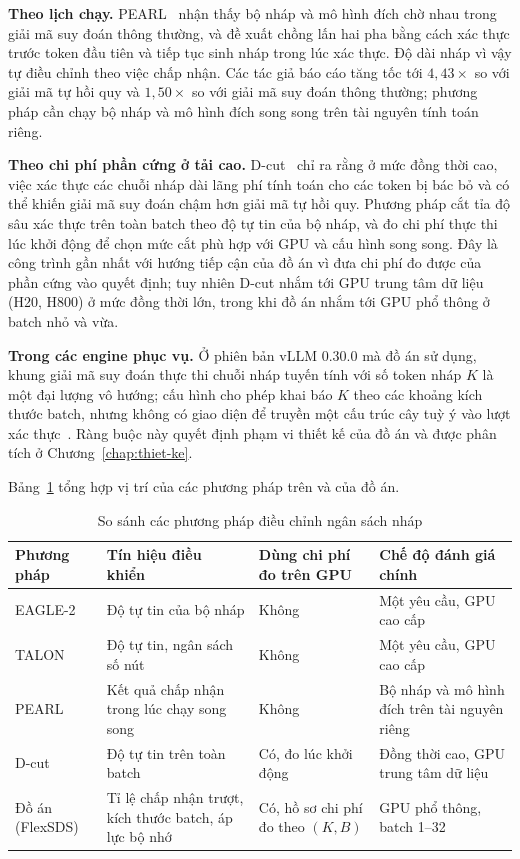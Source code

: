 \textbf{Theo lịch chạy.} PEARL~\cite{liu2025pearl} nhận thấy bộ nháp và mô hình đích chờ nhau trong giải mã suy đoán thông thường, và đề xuất chồng lấn hai pha bằng cách xác thực trước token đầu tiên và tiếp tục sinh nháp trong lúc xác thực. Độ dài nháp vì vậy tự điều chỉnh theo việc chấp nhận. Các tác giả báo cáo tăng tốc tới $4{,}43\times$ so với giải mã tự hồi quy và $1{,}50\times$ so với giải mã suy đoán thông thường; phương pháp cần chạy bộ nháp và mô hình đích song song trên tài nguyên tính toán riêng.

\textbf{Theo chi phí phần cứng ở tải cao.} D-cut~\cite{liu2026dcut} chỉ ra rằng ở mức đồng thời cao, việc xác thực các chuỗi nháp dài lãng phí tính toán cho các token bị bác bỏ và có thể khiến giải mã suy đoán chậm hơn giải mã tự hồi quy. Phương pháp cắt tỉa độ sâu xác thực trên toàn batch theo độ tự tin của bộ nháp, và đo chi phí thực thi lúc khởi động để chọn mức cắt phù hợp với GPU và cấu hình song song. Đây là công trình gần nhất với hướng tiếp cận của đồ án vì đưa chi phí đo được của phần cứng vào quyết định; tuy nhiên D-cut nhắm tới GPU trung tâm dữ liệu (H20, H800) ở mức đồng thời lớn, trong khi đồ án nhắm tới GPU phổ thông ở batch nhỏ và vừa.

\textbf{Trong các engine phục vụ.} Ở phiên bản vLLM 0.30.0 mà đồ án sử dụng, khung giải mã suy đoán thực thi chuỗi nháp tuyến tính với số token nháp $K$ là một đại lượng vô hướng; cấu hình cho phép khai báo $K$ theo các khoảng kích thước batch, nhưng không có giao diện để truyền một cấu trúc cây tuỳ ý vào lượt xác thực~\cite{vllm-repo}. Ràng buộc này quyết định phạm vi thiết kế của đồ án và được phân tích ở Chương~\ref{chap:thiet-ke}.

Bảng~\ref{tab:so-sanh-thich-ung} tổng hợp vị trí của các phương pháp trên và của đồ án.

\begin{table}[htbp]
\centering
\caption{So sánh các phương pháp điều chỉnh ngân sách nháp}
\label{tab:so-sanh-thich-ung}
\small
\begin{tabularx}{\linewidth}{@{}>{\raggedright\arraybackslash}p{22mm}>{\raggedright\arraybackslash}X>{\raggedright\arraybackslash}p{26mm}>{\raggedright\arraybackslash}X@{}}
\toprule
\textbf{Phương pháp} & \textbf{Tín hiệu điều khiển} & \textbf{Dùng chi phí đo trên GPU} & \textbf{Chế độ đánh giá chính} \\
\midrule
EAGLE-2~\cite{li2024eagle2} & Độ tự tin của bộ nháp & Không & Một yêu cầu, GPU cao cấp \\
TALON~\cite{liu2026talon} & Độ tự tin, ngân sách số nút & Không & Một yêu cầu, GPU cao cấp \\
PEARL~\cite{liu2025pearl} & Kết quả chấp nhận trong lúc chạy song song & Không & Bộ nháp và mô hình đích trên tài nguyên riêng \\
D-cut~\cite{liu2026dcut} & Độ tự tin trên toàn batch & Có, đo lúc khởi động & Đồng thời cao, GPU trung tâm dữ liệu \\
Đồ án (FlexSDS) & Tỉ lệ chấp nhận trượt, kích thước batch, áp lực bộ nhớ & Có, hồ sơ chi phí đo theo $(K, B)$ & GPU phổ thông, batch 1--32 \\
\bottomrule
\end{tabularx}
\end{table}

